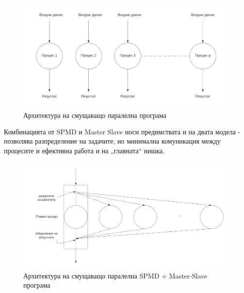\documentclass[a4paper,11pt]{article}
\begin{document}
\begin{figure}[H]
    \centering
    \includegraphics[width=0.9\linewidth]{images/embarassingly_parallel1.png}
    \caption{Архитектура на смущаващо паралелна програма}
    \label{fig:emb-parallel-1}
\end{figure}
Комбинацията от SPMD и Master Slave носи предимствата и на двата модела - позволява разпределение на задачите, но минимална комуникация между процесите и ефективна работа и на „главната“ нишка.
\begin{figure}[H]
    \centering
    \includegraphics[width=0.9\linewidth]{images/embarassingly_parallel2.png.png}
    \caption{Архитектура на смущаващо паралелна SPMD + Master-Slave програма}
    \label{fig:emb-parallel-2}
\end{figure}
\end{document}
